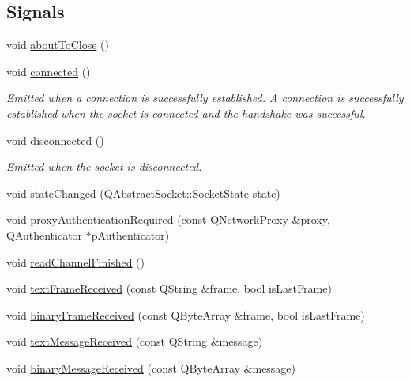 \subsection*{Signals}
\begin{DoxyCompactItemize}
\item 
void \mbox{\hyperlink{class_q_web_socket_a74faf7acf77a4b74cf2c5caa74b1d77a}{about\+To\+Close}} ()
\item 
void \mbox{\hyperlink{class_q_web_socket_a176c51371ba6d3b13fec0f7f287b6102}{connected}} ()
\begin{DoxyCompactList}\small\item\em Emitted when a connection is successfully established. A connection is successfully established when the socket is connected and the handshake was successful. \end{DoxyCompactList}\item 
void \mbox{\hyperlink{class_q_web_socket_aaba1f43d105bea22b4021a68f924169b}{disconnected}} ()
\begin{DoxyCompactList}\small\item\em Emitted when the socket is disconnected. \end{DoxyCompactList}\item 
void \mbox{\hyperlink{class_q_web_socket_aba46b4ae0292aee9632297a56122902a}{state\+Changed}} (Q\+Abstract\+Socket\+::\+Socket\+State \mbox{\hyperlink{class_q_web_socket_abf40a05dfbb85a86355c73f7c2f2c492}{state}})
\item 
void \mbox{\hyperlink{class_q_web_socket_acd5c2e589b072ef513b67c29fd69976c}{proxy\+Authentication\+Required}} (const Q\+Network\+Proxy \&\mbox{\hyperlink{class_q_web_socket_a6451f984f2eb43cbc5fcd6f0dd4421d9}{proxy}}, Q\+Authenticator $\ast$p\+Authenticator)
\item 
void \mbox{\hyperlink{class_q_web_socket_a17d4ab6c6fe8017626fb079cee6518a6}{read\+Channel\+Finished}} ()
\item 
void \mbox{\hyperlink{class_q_web_socket_af0feabc8f7979f054b15d903a54882a6}{text\+Frame\+Received}} (const Q\+String \&frame, bool is\+Last\+Frame)
\item 
void \mbox{\hyperlink{class_q_web_socket_a43bf9793d8edec549ea45d503e9be366}{binary\+Frame\+Received}} (const Q\+Byte\+Array \&frame, bool is\+Last\+Frame)
\item 
void \mbox{\hyperlink{class_q_web_socket_ad0f93d1bf2b5e973dbc3acc4378505e4}{text\+Message\+Received}} (const Q\+String \&message)
\item 
void \mbox{\hyperlink{class_q_web_socket_aaefdf77b949880d571e64a30b01f75e7}{binary\+Message\+Received}} (const Q\+Byte\+Array \&message)

\end{DoxyCompactItemize}
